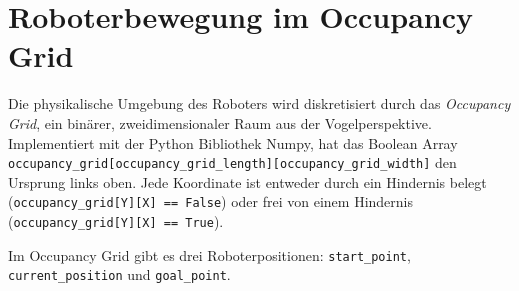 \chapter{Roboterbewegung im Occupancy Grid} \label{ch:roboterbewegung}
\enlargethispage{0.5cm}
Die physikalische Umgebung des Roboters wird diskretisiert durch das \textit{Occupancy Grid}, ein binärer, zweidimensionaler Raum aus der Vogelperspektive. Implementiert mit der Python Bibliothek Numpy, hat das Boolean Array \texttt{occupancy\_grid[occupancy\_grid\_length][occupancy\_grid\_width]} den Ursprung links oben. Jede Koordinate ist entweder durch ein Hindernis belegt (\texttt{occupancy\_grid[Y][X] == False}) oder frei von einem Hindernis (\texttt{occupancy\_grid[Y][X] == True}).

Im Occupancy Grid gibt es drei Roboterpositionen: \texttt{start\_point}, \texttt{current\_position} und \texttt{goal\_point}.
